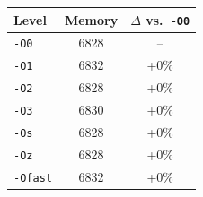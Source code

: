 \begin{tabular*}{\columnwidth}{@{\extracolsep\fill}lcc@{\extracolsep\fill}}
\toprule
\textbf{Level} & \textbf{Memory} & \textbf{$\Delta$ vs.\ \texttt{-O0}} \\
\midrule
\texttt{-O0} & 6828 & -- \\
\texttt{-O1} & 6832 & +0\% \\
\texttt{-O2} & 6828 & +0\% \\
\texttt{-O3} & 6830 & +0\% \\
\texttt{-Os} & 6828 & +0\% \\
\texttt{-Oz} & 6828 & +0\% \\
\texttt{-Ofast} & 6832 & +0\% \\
\bottomrule
\end{tabular*}
